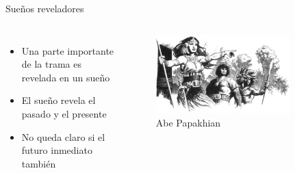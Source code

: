 \begin{frame}{Sueños reveladores}
	\begin{columns}
		\begin{itemize}
			\item Una parte importante de la trama es revelada en un sueño
			\item El sueño revela el pasado y el presente
			\item No queda claro si el futuro inmediato también
		\end{itemize}
		\begin{figure}[htb]
			\centering
			\includegraphics[width=0.8\textwidth]{img/tributos/elephant07}
			\caption{Abe Papakhian}
		\end{figure}
	\end{columns}
\end{frame}
\note[itemize]{
	\item
}

